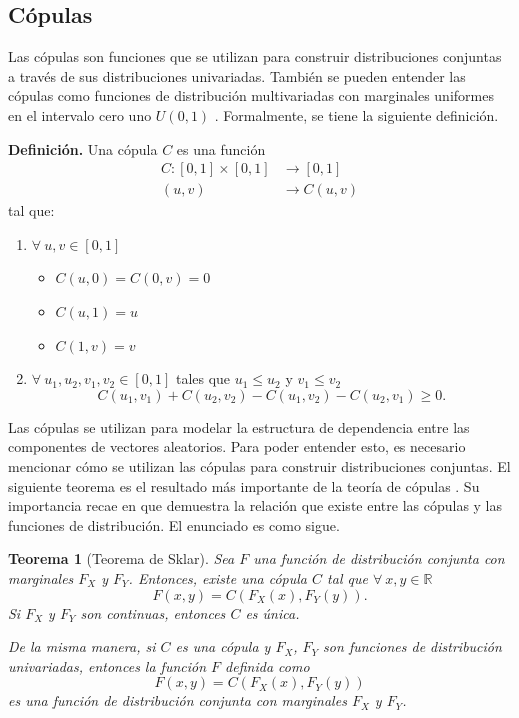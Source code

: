 \documentclass[11pt,a4paper]{article}
\newcommand{\R}{\mathbb{R}}
\newtheorem{theorem}{Teorema}[section]
\begin{document}
\label{cap:cop}
\subsection{Cópulas} \label{sec_copulas}

Las cópulas son funciones que se utilizan para construir distribuciones conjuntas a través de sus distribuciones univariadas. También se pueden entender las cópulas como funciones de distribución multivariadas con marginales uniformes en el intervalo cero uno $U(0, 1)$ \citep{nelsen}. Formalmente, se tiene la siguiente definición.

\textbf{Definición.} Una cópula $C$ es una función 
\begin{align*}
C: [0,1]\times[0,1]&\to [0,1]\\
(u,v) &\to C(u,v)
\end{align*} tal que:
\begin{enumerate}
\item $\forall \ u,v \in [0,1]$
\begin{itemize}
\item $C (u,0) = C(0,v) = 0$
\item $C(u,1) = u$
\item $C(1, v) = v$
\end{itemize}
\item $\forall \ u_1, u_2, v_1, v_2 \in [0,1]$ tales que $u_1 \leq u_2$ y $v_1 \leq v_2$  $$C (u_1,v_1)+C (u_2,v_2) - C(u_1,v_2) - C(u_2,v_1)\geq 0.$$
\end{enumerate}

Las cópulas se utilizan para modelar la estructura de dependencia entre las componentes de vectores aleatorios. Para poder entender esto, es necesario mencionar cómo se utilizan las cópulas para construir distribuciones conjuntas. El siguiente teorema es el resultado más importante de la teoría de cópulas \citep{copula_modeling}. Su importancia recae en que demuestra la relación que existe entre las cópulas y las funciones de distribución. El enunciado es como sigue.

\begin{theorem}[Teorema de Sklar]
\label{sklar}
Sea $F$ una función de distribución conjunta con marginales $F_X$ y $F_Y$. Entonces, existe una cópula $C$ tal que $\forall \ x,y \in \R$ $$F(x,y) = C(F_X(x), F_Y(y)).$$ Si $F_X$ y $F_Y$ son continuas, entonces $C$ es única.

De la misma manera, si $C$ es una cópula y $F_X$, $F_Y$ son funciones de distribución univariadas, entonces la función $F$ definida como $$F(x, y) = C(F_X(x), F_Y(y))$$ es una función de distribución conjunta con marginales $F_X$ y $F_Y$.
\end{theorem}
\end{document}

